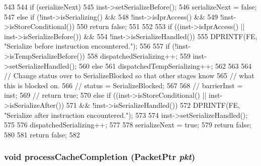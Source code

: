 \begin{DoxyCode}
543 {
544     if (serializeNext) {
545         inst->setSerializeBefore();
546         serializeNext = false;
547     } else if (!inst->isSerializing() &&
548                !inst->isIprAccess() &&
549                !inst->isStoreConditional()) {
550         return false;
551     }
552 
553     if ((inst->isIprAccess() || inst->isSerializeBefore()) &&
554         !inst->isSerializeHandled()) {
555         DPRINTF(FE, "Serialize before instruction encountered.\n");
556 
557         if (!inst->isTempSerializeBefore()) {
558             dispatchedSerializing++;
559             inst->setSerializeHandled();
560         } else {
561             dispatchedTempSerializing++;
562         }
563 
564         // Change status over to SerializeBlocked so that other stages know
565         // what this is blocked on.
566 //        status = SerializeBlocked;
567 
568 //        barrierInst = inst;
569 //        return true;
570     } else if ((inst->isStoreConditional() || inst->isSerializeAfter())
571                && !inst->isSerializeHandled()) {
572         DPRINTF(FE, "Serialize after instruction encountered.\n");
573 
574         inst->setSerializeHandled();
575 
576         dispatchedSerializing++;
577 
578         serializeNext = true;
579         return false;
580     }
581     return false;
582 }
\end{DoxyCode}
\hypertarget{classFrontEnd_a3dc029c2e87eb911352b82ff15c86236}{
\subsubsection[{processCacheCompletion}]{\setlength{\rightskip}{0pt plus 5cm}void processCacheCompletion ({\bf PacketPtr} {\em pkt})}}
\label{classFrontEnd_a3dc029c2e87eb911352b82ff15c86236}



